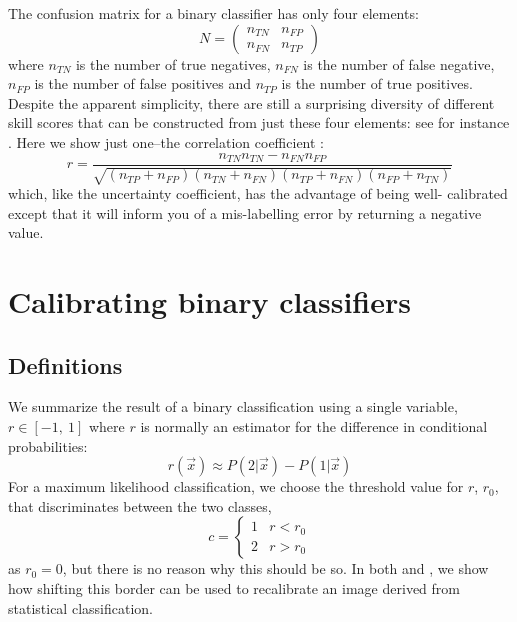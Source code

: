 \documentclass{article}
\begin{document}
The confusion matrix for a binary classifier has only four elements:
\begin{equation}
	N = \left ( \begin{array}{cc}
		n_{TN} & n_{FP} \\
		n_{FN} & n_{TP}
	\end{array} \right )
\end{equation}
where $n_{TN}$ is the number of true negatives, $n_{FN}$ is the number of
false negative, $n_{FP}$ is the number of false positives and $n_{TP}$ is
the number of true positives.
Despite the apparent simplicity, there are still a surprising diversity of
different skill scores that can be constructed from just these four elements:
see for instance \citet{Jolliffe_Stephenson2003}.
Here we show just one--the correlation coefficient \citep{Mills2004}:
\begin{equation}
	r = \frac{n_{TN} n_{TN} - n_{FN} n_{FP}}
	{\sqrt{(n_{TP}+n_{FP})(n_{TN}+n_{FN})(n_{TP}+n_{FN})(n_{FP}+n_{TN})}}
\end{equation}
which, like the uncertainty coefficient, has the advantage of being well-
calibrated except that it will inform you of a mis-labelling error by returning
a negative value.


\section{Calibrating binary classifiers}

\subsection{Definitions}

We summarize the result of a binary classification using a single variable, 
$r \in [-1, ~1]$ where $r$ is normally an estimator for the difference in
conditional probabilities:
\begin{equation}
	r(\vec x) \approx P(2|\vec x) - P(1|\vec x)
\end{equation}
For a maximum
likelihood classification, we choose the threshold value for $r$, $r_0$,
that discriminates between the two classes,
\begin{equation}
c = \left \lbrace
\begin{array}{lr}
1 & r<r_0 \\
2 & r>r_0
\end{array}
\right .
\end{equation}
as $r_0 = 0$, but there is no reason why this should be so.  
In both \citet{Mills2009} and \citet{Mills2011}, we show how shifting this
border can be used to recalibrate an image derived from statistical
classification.
\end{document}
